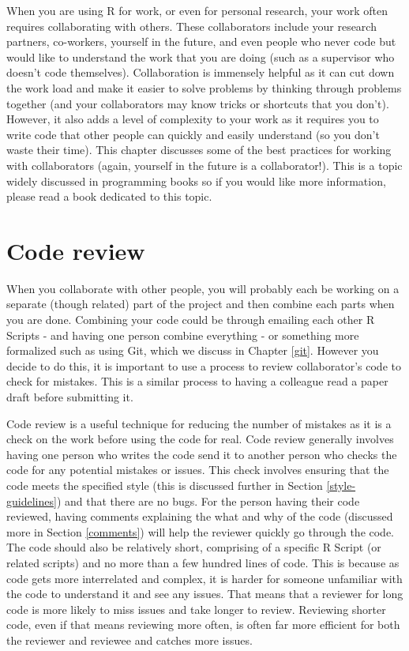 \documentclass[
  12pt,
]{book}
\begin{document}
When you are using R for work, or even for personal research, your work often requires collaborating with others. These collaborators include your research partners, co-workers, yourself in the future, and even people who never code but would like to understand the work that you are doing (such as a supervisor who doesn't code themselves). Collaboration is immensely helpful as it can cut down the work load and make it easier to solve problems by thinking through problems together (and your collaborators may know tricks or shortcuts that you don't). However, it also adds a level of complexity to your work as it requires you to write code that other people can quickly and easily understand (so you don't waste their time). This chapter discusses some of the best practices for working with collaborators (again, yourself in the future is a collaborator!). This is a topic widely discussed in programming books so if you would like more information, please read a book dedicated to this topic.

\hypertarget{code-review}{%
\section{Code review}\label{code-review}}

When you collaborate with other people, you will probably each be working on a separate (though related) part of the project and then combine each parts when you are done. Combining your code could be through emailing each other R Scripts - and having one person combine everything - or something more formalized such as using Git, which we discuss in Chapter \ref{git}. However you decide to do this, it is important to use a process to review collaborator's code to check for mistakes. This is a similar process to having a colleague read a paper draft before submitting it.

Code review is a useful technique for reducing the number of mistakes as it is a check on the work before using the code for real. Code review generally involves having one person who writes the code send it to another person who checks the code for any potential mistakes or issues. This check involves ensuring that the code meets the specified style (this is discussed further in Section \ref{style-guidelines}) and that there are no bugs. For the person having their code reviewed, having comments explaining the what and why of the code (discussed more in Section \ref{comments}) will help the reviewer quickly go through the code. The code should also be relatively short, comprising of a specific R Script (or related scripts) and no more than a few hundred lines of code. This is because as code gets more interrelated and complex, it is harder for someone unfamiliar with the code to understand it and see any issues. That means that a reviewer for long code is more likely to miss issues and take longer to review. Reviewing shorter code, even if that means reviewing more often, is often far more efficient for both the reviewer and reviewee and catches more issues.
\end{document}
